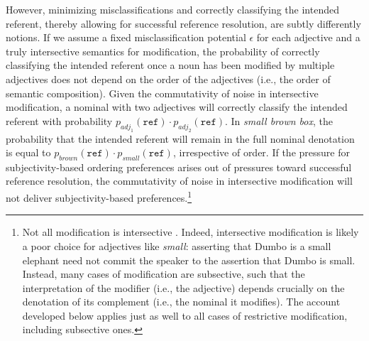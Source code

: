 \documentclass[preprint,authoryear]{elsarticle}\frenchspacing
\begin{document}
However, minimizing misclassifications and correctly classifying the intended referent, thereby allowing for successful reference resolution, are subtly differently notions. If we assume a fixed misclassification potential $\epsilon$ for each adjective and a truly intersective semantics for modification, the probability of correctly classifying the intended referent once a noun has been modified by multiple adjectives does not depend on the order of the adjectives (i.e., the order of semantic composition). %
Given the commutativity of noise in intersective modification, a nominal with two adjectives will correctly classify the intended referent with probability $p_{adj_1}(\texttt{ref}) \cdot p_{adj_2}(\texttt{ref})$. In \emph{small brown box}, the probability that the intended referent will remain in the full nominal denotation is equal to $p_{brown}(\texttt{ref}) \cdot p_{small}(\texttt{ref})$, irrespective of order. If the pressure for subjectivity-based ordering preferences %
arises out of pressures toward successful reference resolution, the commutativity of noise in intersective modification will not deliver subjectivity-based preferences.\footnote{Not all modification is intersective \citep{kamppartee1995,truswell2009,mcnally2016}. Indeed, intersective modification is likely a poor choice for adjectives like \emph{small}: asserting that Dumbo is a small elephant need not commit the speaker to the assertion that Dumbo is small. Instead, many cases of modification are subsective, such that the interpretation of the modifier (i.e., the adjective) depends crucially on the denotation of its complement (i.e., the nominal it modifies). The account developed below applies just as well to all cases of restrictive modification, including subsective ones.}
\end{document}
